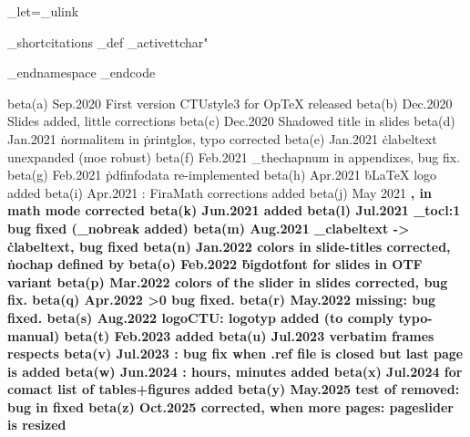 \_let\urllink=\_ulink

\_shortcitations
\_def
\_activettchar"

\_endnamespace %
\_endcode


beta(a) Sep.2020  First version CTUstyle3 for OpTeX released
beta(b) Dec.2020  Slides added, little corrections
beta(c) Dec.2020  Shadowed title in slides
beta(d) Jan.2021  \.normalitem in \.printglos, typo corrected
beta(e) Jan.2021  \.clabeltext unexpanded (moe robust)
beta(f) Feb.2021  \_thechapnum in appendixes, bug fix.
beta(g) Feb.2021  \.pdfinfodata re-implemented
beta(h) Apr.2021  \.bLaTeX logo added
beta(i) Apr.2021  \slides: FiraMath corrections added
beta(j) May 2021  \bf, \bi in math mode corrected
beta(k) Jun.2021  \oddchapters added
beta(l) Jul.2021  \_tocl:1 bug fixed (\_nobreak added)
beta(m) Aug.2021  \_clabeltext -> \.clabeltext, bug fixed
beta(n) Jan.2022  colors in slide-titles corrected, \.nochap defined by \eoldef
beta(o) Feb.2022  \.bigdotfont for slides in OTF variant
beta(p) Mar.2022  colors of the slider in slides corrected, bug fix.
beta(q) Apr.2022  \ttline>0 bug fixed.
beta(r) May.2022  \shiftoffset missing: bug fixed.
beta(s) Aug.2022  logoCTU: logotyp added (to comply typo-manual)
beta(t) Feb.2023  \fnumbering added
beta(u) Jul.2023  verbatim frames respects \leftskip
beta(v) Jul.2023  \draft: bug fix when .ref file is closed but last page is added
beta(w) Jun.2024  \draft: hours, minutes added
beta(x) Jul.2024  \totf for comact list of tables+figures added
beta(y) May.2025  test of \hexstring removed: bug in \pdfinfo fixed
beta(z) Oct.2025  \wideformat corrected, when more pages: pageslider is resized
